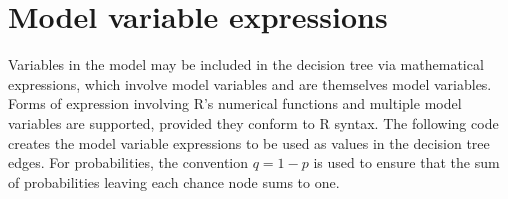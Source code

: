 \documentclass[
]{article}
\begin{document}
\hypertarget{model-variable-expressions}{%
\section{Model variable expressions}\label{model-variable-expressions}}

Variables in the model may be included in the decision tree via
mathematical expressions, which involve model variables and are
themselves model variables. Forms of expression involving R's numerical
functions and multiple model variables are supported, provided they
conform to R syntax. The following code creates the model variable
expressions to be used as values in the decision tree edges. For
probabilities, the convention \(q = 1-p\) is used to ensure that the sum
of probabilities leaving each chance node sums to one.
\end{document}
